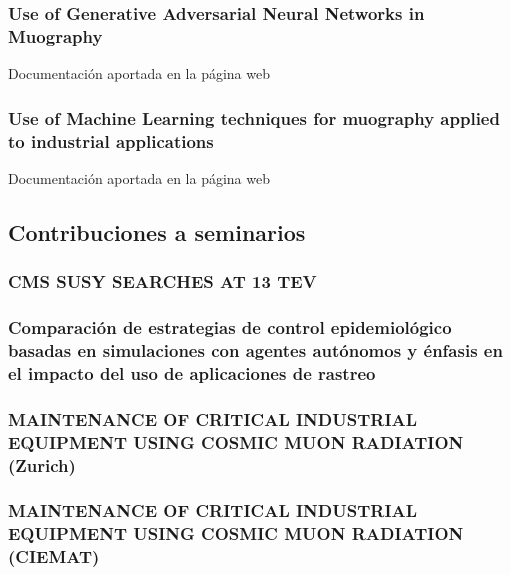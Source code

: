 \documentclass[a4paper, 11pt, twoside, openright]{report}
\begin{document}
\subsubsection{Use of Generative Adversarial Neural Networks in Muography}
%
Documentación aportada en la página web

\subsubsection{Use of Machine Learning techniques for muography applied to industrial applications}
%
Documentación aportada en la página web


\subsection{Contribuciones a seminarios}

\subsubsection{CMS SUSY SEARCHES AT 13 TEV}


\subsubsection{Comparación de estrategias de control epidemiológico basadas en simulaciones con agentes autónomos y énfasis en el impacto del uso de aplicaciones de rastreo}


\subsubsection{MAINTENANCE OF CRITICAL INDUSTRIAL EQUIPMENT USING COSMIC MUON RADIATION (Zurich)}


\subsubsection{MAINTENANCE OF CRITICAL INDUSTRIAL EQUIPMENT USING COSMIC MUON RADIATION (CIEMAT)}

\end{document}
